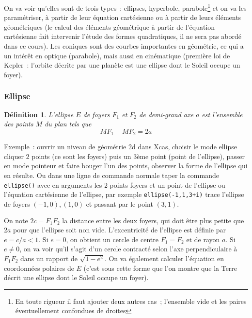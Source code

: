 \documentclass[a4paper,11pt]{article}
\newtheorem{defn}[thm]{D\'efinition}
\begin{document}
\begin{giacjshere}

On va voir qu'elles sont de trois types~: ellipses, hyperbole,
parabole\footnote{En toute rigueur il faut ajouter deux autres cas~;
l'ensemble vide et les paires \'eventuellement confondues de droites} 
et on va les param\'etriser, \`a partir de leur \'equation
cart\'esienne ou \`a partir de leurs \'el\'ements g\'eom\'etriques
(le calcul des \'el\'ements g\'eom\'etrique \`a partir de l'\'equation
cart\'esienne fait intervenir l'\'etude des formes quadratiques, il ne
sera pas abord\'e dans ce cours).
Les coniques sont des courbes importantes en g\'eom\'etrie, 
ce qui a un int\'er\^et en optique 
(parabole), mais aussi en cin\'ematique (premi\`ere loi de Kepler~:
l'orbite d\'ecrite par une plan\`ete est une ellipse dont
le Soleil occupe un foyer).


\subsubsection{Ellipse}
\begin{defn}
L'ellipse $E$ de foyers $F_1$ et $F_2$ de demi-grand axe
$a$ est l'ensemble des points $M$ du plan tels que 
\[ MF_1+MF_2=2a\]
\end{defn}
Exemple~: ouvrir un niveau de g\'eom\'etrie 2d dans Xcas,
choisir le mode ellipse cliquer 2 points (ce sont les foyers)
puis un 3\`eme point (point de l'ellipse), passer en mode
pointeur et faire bouger l'un des points, observer la forme
de l'ellipse qui en r\'esulte. Ou dans une ligne de commande
normale taper la commande \verb|ellipse()| avec
en arguments les 2 points foyers et un point de l'ellipse
ou l'\'equation cart\'esienne de l'ellipse, par exemple
\verb|ellipse(-1,1,3+i)| trace l'ellipse de foyers $(-1,0), (1,0)$
et passant par le point $(3,1)$.

On note $2c=F_1F_2$ la distance entre les deux foyers, qui doit \^etre
plus petite que $2a$ pour que l'ellipse soit non vide.
L'excentricit\'e de l'ellipse est d\'efinie par $e=c/a < 1$. Si $e=0$,
on obtient un cercle de centre $F_1=F_2$ et de rayon $a$. Si $e\neq 0$,
on va voir qu'il s'agit d'un cercle contracté
selon l'axe perpendiculaire \`a $F_1F_2$ dans un rapport de 
$\sqrt{1-e^2}$. On va \'egalement calculer l'\'equation en
coordonn\'ees polaires de $E$ (c'est sous cette forme
que l'on montre que la Terre d\'ecrit une ellipse 
dont le Soleil occupe un foyer).


\end{giacjshere}
\end{document}
